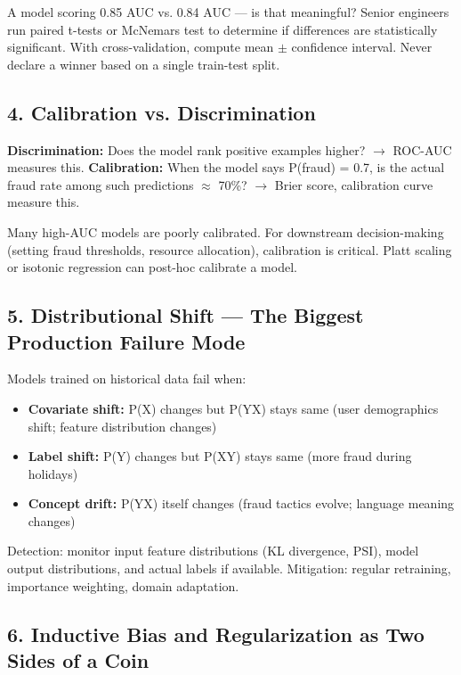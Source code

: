 \documentclass[11pt]{article}
\providecommand{\tightlist}{\setlength{\itemsep}{1pt}\setlength{\parskip}{0pt}}
\begin{document}
A model scoring 0.85 AUC vs. 0.84 AUC --- is that meaningful? Senior engineers run paired t-tests or McNemar\textquotesingle s test to determine if differences are statistically significant. With cross-validation, compute mean \(\pm\) confidence interval. Never declare a winner based on a single train-test split.

\subsection{4. Calibration vs. Discrimination}\label{4-calibration-vs-discrimination}

\textbf{Discrimination:} Does the model rank positive examples higher? \(\rightarrow\) ROC-AUC measures this.
\textbf{Calibration:} When the model says P(fraud) = 0.7, is the actual fraud rate among such predictions \(\approx\) 70\%? \(\rightarrow\) Brier score, calibration curve measure this.

Many high-AUC models are poorly calibrated. For downstream decision-making (setting fraud thresholds, resource allocation), calibration is critical. Platt scaling or isotonic regression can post-hoc calibrate a model.

\subsection{5. Distributional Shift --- The Biggest Production Failure Mode}\label{5-distributional-shift--the-biggest-production-failure-mode}

Models trained on historical data fail when:

\begin{itemize}
\tightlist
\item
  \textbf{Covariate shift:} P(X) changes but P(Y\textbar X) stays same (user demographics shift; feature distribution changes)
\item
  \textbf{Label shift:} P(Y) changes but P(X\textbar Y) stays same (more fraud during holidays)
\item
  \textbf{Concept drift:} P(Y\textbar X) itself changes (fraud tactics evolve; language meaning changes)
\end{itemize}

Detection: monitor input feature distributions (KL divergence, PSI), model output distributions, and actual labels if available. Mitigation: regular retraining, importance weighting, domain adaptation.

\subsection{6. Inductive Bias and Regularization as Two Sides of a Coin}\label{6-inductive-bias-and-regularization-as-two-sides-of-a-coin}
\end{document}
